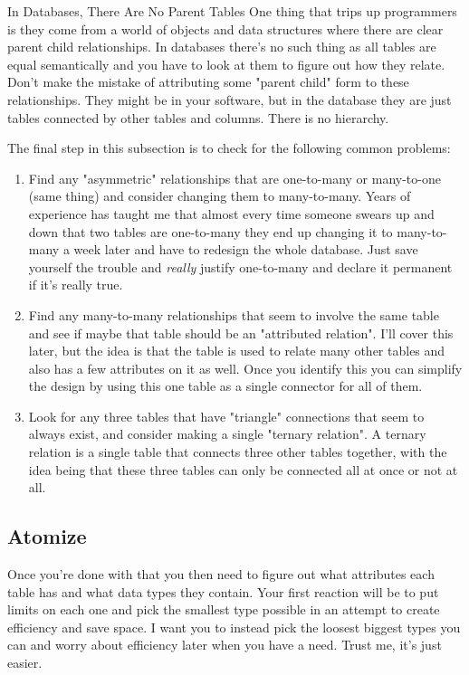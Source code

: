 \begin{note}{In Databases, There Are No Parent Tables}
One thing that trips up programmers is they come from a world of objects and data structures where
there are clear parent child relationships.  In databases there's no such thing as all tables
are equal semantically and you have to look at them to figure out how they relate.  Don't make
the mistake of attributing some "parent child" form to these relationships.  They might be
in your software, but in the database they are just tables connected by other tables and columns.
There is no hierarchy.
\end{note}

The final step in this subsection is to check for the following common problems:

\begin{enumerate}
\item Find any "asymmetric" relationships that are one-to-many or many-to-one (same thing) and
    consider changing them to many-to-many.  Years of experience has taught me
    that almost every time someone swears up and down that two tables are one-to-many they end
    up changing it to many-to-many a week later and have to redesign the whole database.  Just
    save yourself the trouble and \emph{really} justify one-to-many and declare it permanent
    if it's really true.
\item Find any many-to-many relationships that seem to involve the same table and see if maybe
    that table should be an "attributed relation".  I'll cover this later, but the idea
    is that the table is used to relate many other tables and also has a few attributes on it
    as well.  Once you identify this you can simplify the design by using this one table as
    a single connector for all of them.
\item Look for any three tables that have "triangle" connections that seem to always exist, and
    consider making a single "ternary relation".  A ternary relation is a single table that
    connects three other tables together, with the idea being that these three tables can
    only be connected all at once or not at all.
\end{enumerate}


\subsection{Atomize}

Once you're done with that you then need to figure out what attributes each table has and what
data types they contain.  Your first reaction will be to put limits on each one and pick the smallest
type possible in an attempt to create efficiency and save space.  I want you to instead pick the loosest
biggest types you can and worry about efficiency later when you have a need.  Trust me, it's just
easier.

